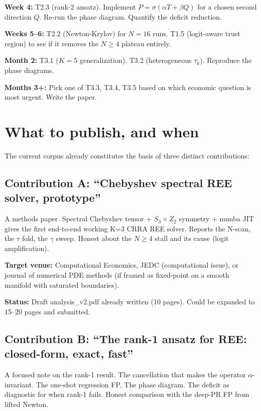 \documentclass[11pt]{article}
\begin{document}
\textbf{Week 4:} T2.3 (rank-2 ansatz). Implement $P = \sigma(\alpha T + \beta Q)$ for a
chosen second direction $Q$. Re-run the phase diagram. Quantify the deficit reduction.

\textbf{Weeks 5--6:} T2.2 (Newton-Krylov) for $N=16$ runs. T1.5 (logit-aware trust region)
to see if it removes the $N\ge 4$ plateau entirely.

\textbf{Month 2:} T3.1 ($K=5$ generalization). T3.2 (heterogeneous $\tau_k$). Reproduce
the phase diagrams.

\textbf{Months 3+:} Pick one of T3.3, T3.4, T3.5 based on which economic question is
most urgent. Write the paper.

\newpage
\section{What to publish, and when}

The current corpus already constitutes the basis of three distinct contributions:

\subsection{Contribution A: ``Chebyshev spectral REE solver, prototype''}

A methods paper. Spectral Chebyshev tensor + $S_3\times Z_2$ symmetry + numba JIT
gives the first end-to-end working K=3 CRRA REE solver. Reports the N-scan, the
$\tau$ fold, the $\gamma$ sweep. Honest about the $N\ge 4$ stall and its cause
(logit amplification).

\textbf{Target venue:} Computational Economics, JEDC (computational issue), or
journal of numerical PDE methods (if framed as fixed-point on a smooth manifold with
saturated boundaries).

\textbf{Status:} Draft analysis\_v2.pdf already written (10 pages). Could be expanded
to 15--20 pages and submitted.

\subsection{Contribution B: ``The rank-1 ansatz for REE: closed-form, exact, fast''}

A focused note on the rank-1 result. The cancellation that makes the operator
$\alpha$-invariant. The one-shot regression FP. The phase diagram. The deficit as
diagnostic for when rank-1 fails. Honest comparison with the deep-PR FP from
lifted Newton.
\end{document}
